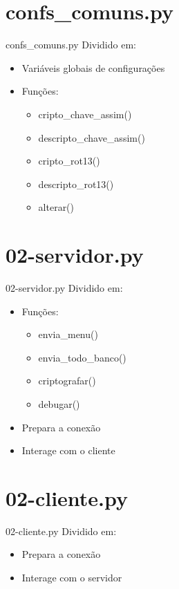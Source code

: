 \documentclass[xcolor=dvipsnames,table]{beamer}
\begin{document}

\section{confs\_comuns.py}
\begin{frame}{confs\_comuns.py}
	Dividido em:
	\begin{itemize}
		\item Variáveis globais de configurações
		\item Funções:
		\begin{itemize}
			\item cripto\_chave\_assim()
			\item descripto\_chave\_assim()
			\item cripto\_rot13()
			\item descripto\_rot13()
			\item alterar()
		\end{itemize}
	\end{itemize}
\end{frame}

\section{02-servidor.py}
\begin{frame}{02-servidor.py}
	Dividido em:
	\begin{itemize}
		\item Funções:
		\begin{itemize}
			\item envia\_menu()
			\item envia\_todo\_banco()
			\item criptografar()
			\item debugar()
		\end{itemize}
		\item Prepara a conexão
		\item Interage com o cliente
	\end{itemize}
\end{frame}

\section{02-cliente.py}
\begin{frame}{02-cliente.py}
	Dividido em:
	\begin{itemize}
		\item Prepara a conexão
		\item Interage com o servidor
	\end{itemize}
\end{frame}
\end{document}
